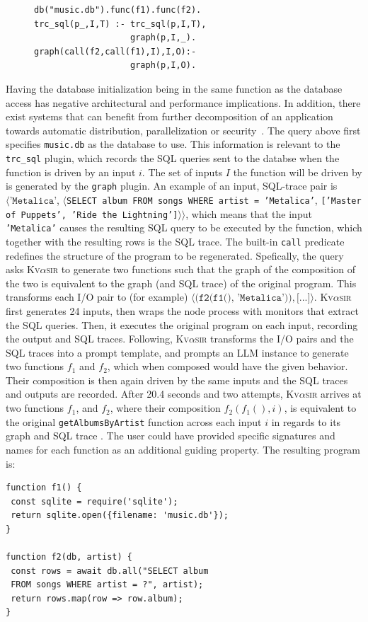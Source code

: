 \documentclass[nonacm,sigplan]{acmart}
\newcommand{\sys}{{\scshape Kv{$\alpha$}sir}\xspace}
\newcommand{\ttt}[1]{\texttt{#1}\xspace}
\begin{document}
\begin{figure}
  \begin{verbatim}
db("music.db").func(f1).func(f2).
trc_sql(p_,I,T) :- trc_sql(p,I,T),
                   graph(p,I,_).
graph(call(f2,call(f1),I),I,O):-
                   graph(p,I,O).
\end{verbatim}
\end{figure}
Having the database initialization being in the same function as 
the database access has negative architectural and performance implications.
In addition, there exist systems that can benefit from further decomposition
of an application towards automatic distribution, parallelization or security~\cite{Towards_Modern_Ghemaw_2023, vasilakis2019ignis, vasilakis2018breakapp}.
The query above first specifies \ttt{music.db} as the database to use.
This information is relevant to the \ttt{trc\_sql} plugin, which records the SQL queries 
sent to the databse when the function is driven by an input $i$.
The set of inputs $I$ the function will be driven by is generated by the \ttt{graph} plugin.
An example of an input, SQL-trace pair is
$\langle\ttt{'Metalica'}$, $\langle$\ttt{SELECT album FROM songs WHERE artist = 'Metalica'}, \ttt{['Master of Puppets', 'Ride the Lightning']}$\rangle\rangle$,
which means that the input \ttt{'Metalica'} causes the resulting SQL query to be executed by the function,
which together with the resulting rows is the SQL trace.
The built-in \ttt{call} predicate redefines the structure of the program to be regenerated. 
Spefically, the query asks \sys to generate two functions such 
that the graph of the composition of the two is equivalent to the graph (and SQL trace) of the original program.
This transforms each I/O pair to (for example) $\langle\ttt{(f2(f1(), 'Metalica'))}, \ttt{[...]}\rangle$.
\sys first generates 24 inputs, then wraps the node process with monitors that extract the SQL queries.
Then, it executes the original program on each input, recording the output and SQL traces.
Following, \sys transforms the I/O pairs and the SQL traces into a prompt template,
and prompts an LLM instance to generate two functions $f_1$ and $f_2$, which when composed would have the given behavior.
Their composition is then again driven by the same inputs and the SQL traces and outputs are recorded.
After 20.4 seconds and two attempts, \sys arrives at two functions $f_1$, and 
$f_2$, where their composition $f_2(f_1(), i)$,
is equivalent to the original \ttt{getAlbumsByArtist} function across each input $i$ in regards to its graph and SQL trace .
The user could have provided specific signatures and names for each 
function as an additional guiding property.
The resulting program is:
\begin{verbatim}
function f1() {
 const sqlite = require('sqlite');
 return sqlite.open({filename: 'music.db'});
}

function f2(db, artist) {
 const rows = await db.all("SELECT album
 FROM songs WHERE artist = ?", artist);
 return rows.map(row => row.album); 
}
\end{verbatim}
\end{document}
